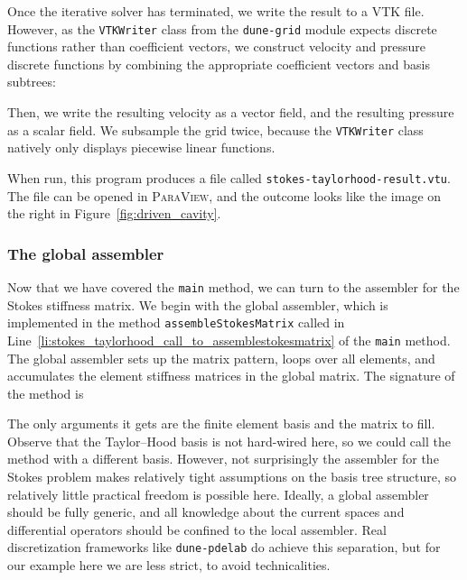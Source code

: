 \documentclass[a4paper,10pt,headings=normal,bibliography=totoc]{scrartcl}
\newcommand{\cpp}[1]{\lstinline[basicstyle=\ttfamily]!#1!}
\newcommand{\program}[1]{\textsc{#1}\xspace}
\newcommand{\dunemodule}[1]{\texttt{#1}}
\newcommand{\file}[1]{\texttt{#1}}
\begin{document}
Once the iterative solver has terminated, we write the result to a VTK file.
However, as the \cpp{VTKWriter} class from the \dunemodule{dune-grid} module
expects discrete functions rather than coefficient vectors, we construct
velocity and pressure discrete functions by combining the appropriate
coefficient vectors and basis subtrees:
%

%
Then, we write the resulting velocity as a vector field,
and the resulting pressure as a scalar field.  We subsample the grid twice, because the \cpp{VTKWriter}
class natively only displays piecewise linear functions.
%

%
When run, this program produces a file called \file{stokes-taylorhood-result.vtu}.  The file can be opened in
\program{ParaView}, and the outcome looks like the image on the right in Figure~\ref{fig:driven_cavity}.

\subsubsection{The global assembler}

Now that we have covered the \cpp{main} method, we can turn to the assembler for the Stokes stiffness matrix.
We begin with the global assembler,
which is implemented in the method \cpp{assembleStokesMatrix} called in Line~\ref{li:stokes_taylorhood_call_to_assemblestokesmatrix}
of the \cpp{main} method.
The global assembler sets up the matrix pattern, loops over all elements, and accumulates the element stiffness
matrices in the global matrix. The signature of the method is
%

%
The only arguments it gets are the finite element basis and the matrix to fill.  Observe that the Taylor--Hood basis is not
hard-wired here, so we could call the method with a different basis.
However, not surprisingly the assembler for the Stokes problem makes relatively tight assumptions on the basis tree
structure, so relatively little practical freedom is possible here.  Ideally, a global assembler should be fully
generic, and all knowledge about the current spaces and differential operators should be confined to the local
assembler.  Real discretization frameworks like \dunemodule{dune-pdelab} do achieve this separation,
but for our example here we are less strict, to avoid technicalities.
\end{document}
